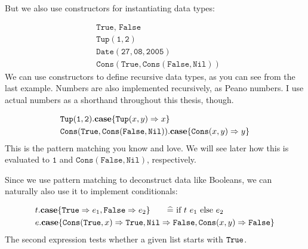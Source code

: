 \documentclass[twoside,12pt,a4paper]{article}
\begin{document}
But we also use constructors for instantiating data types:
\begin{example}
    \begin{align*}
        &\texttt{True, False}\\
        &\mathtt{Tup(1,2)}\\
        &\mathtt{Date(27, 08, 2005)}\\
        &\mathtt{Cons(True, Cons(False, Nil))}              
    \end{align*}
    We can use constructors to define recursive data types, as you can see from the last example.
    Numbers are also implemented recursively, as Peano numbers. I use actual numbers as a shorthand throughout this thesis, though.
\end{example}

\begin{example}
    \begin{align*}
        &\mathtt{Tup(1,2)}.\textbf{case}\{\mathtt{Tup(}x, y\mathtt{)}\Rightarrow x\}\\
        &\mathtt{Cons(True, Cons(False, Nil))}.\textbf{case}\{\mathtt{Cons(}x, y\mathtt{)}\Rightarrow y\}   
    \end{align*}
    This is the pattern matching you know and love. 
    We will see later how this is evaluated to $\mathtt{1}$ and $\mathtt{Cons(False, Nil)}$, respectively.
\end{example}

Since we use pattern matching to deconstruct data like Booleans, we can naturally also use it to implement conditionals:
\begin{example}
    \begin{align*}
        &t.\expatmatch{\True\Rightarrow e_1, \False\Rightarrow e_2} \tag*{$\widehat{=}$ if $t$ $e_1$ else $e_2$}\\
        &e.\expatmatch{\mathttbrackets{Cons}{\True, x}\Rightarrow \True, 
        \mathtt{Nil\Rightarrow False}, \mathttbrackets{Cons}{x, y}\Rightarrow\False}
    \end{align*}
The second expression tests whether a given list starts with $\mathtt{True}$.
\end{example}
\end{document}
